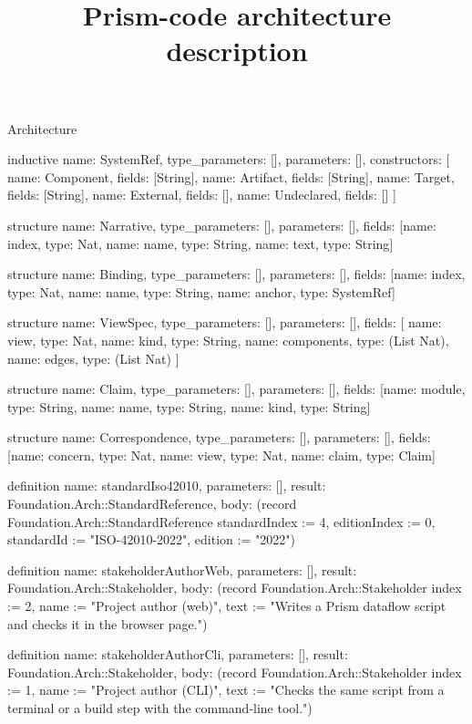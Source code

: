 \begin{lexlean}{Architecture}
\title{Prism-code architecture description}
\begin{semanticmodule}
inductive{
  name: SystemRef,
  type_parameters: [],
  parameters: [],
  constructors: [
    {name: Component, fields: [String]},
    {name: Artifact, fields: [String]},
    {name: Target, fields: [String]},
    {name: External, fields: []},
    {name: Undeclared, fields: []}
  ]
}

structure{
  name: Narrative,
  type_parameters: [],
  parameters: [],
  fields: [{name: index, type: Nat}, {name: name, type: String}, {name: text, type: String}]
}

structure{
  name: Binding,
  type_parameters: [],
  parameters: [],
  fields: [{name: index, type: Nat}, {name: name, type: String}, {name: anchor, type: SystemRef}]
}

structure{
  name: ViewSpec,
  type_parameters: [],
  parameters: [],
  fields: [
    {name: view, type: Nat},
    {name: kind, type: String},
    {name: components, type: (List Nat)},
    {name: edges, type: (List Nat)}
  ]
}

structure{
  name: Claim,
  type_parameters: [],
  parameters: [],
  fields: [{name: module, type: String}, {name: name, type: String}, {name: kind, type: String}]
}

structure{
  name: Correspondence,
  type_parameters: [],
  parameters: [],
  fields: [{name: concern, type: Nat}, {name: view, type: Nat}, {name: claim, type: Claim}]
}

definition{
  name: standardIso42010,
  parameters: [],
  result: Foundation.Arch::StandardReference,
  body: (record Foundation.Arch::StandardReference {standardIndex := 4, editionIndex := 0, standardId := "ISO-42010-2022", edition := "2022"})
}

definition{
  name: stakeholderAuthorWeb,
  parameters: [],
  result: Foundation.Arch::Stakeholder,
  body: (record Foundation.Arch::Stakeholder {index := 2, name := "Project author (web)", text := "Writes a Prism dataflow script and checks it in the browser page."})
}

definition{
  name: stakeholderAuthorCli,
  parameters: [],
  result: Foundation.Arch::Stakeholder,
  body: (record Foundation.Arch::Stakeholder {index := 1, name := "Project author (CLI)", text := "Checks the same script from a terminal or a build step with the command-line tool."})
}


\end{semanticmodule}
\end{lexlean}
